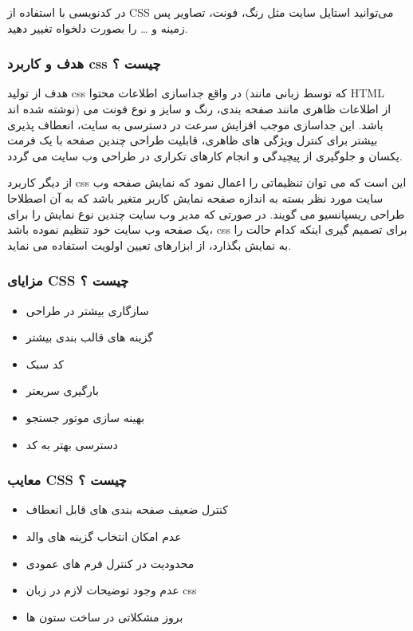 در کدنویسی با استفاده از CSS می‌توانید استایل سایت مثل رنگ، فونت، تصاویر پس زمینه و … را بصورت دلخواه تغییر دهید.

\subsubsection{هدف و کاربرد css چیست ؟}
هدف از تولید css در واقع جداسازی اطلاعات محتوا (که توسط زبانی مانند HTML نوشته شده اند) از اطلاعات ظاهری مانند صفحه بندی، رنگ و سایز و نوع فونت می باشد. این جداسازی موجب افزایش سرعت در دسترسی به سایت، انعطاف پذیری بیشتر برای کنترل ویژگی های ظاهری، قابلیت طراحی چندین صفحه با یک فرمت یکسان و جلوگیری از پیچیدگی و انجام کارهای تکراری در طراحی وب سایت می گردد.

از دیگر کاربرد css این است که می توان تنظیماتی را اعمال نمود که نمایش صفحه وب سایت مورد نظر بسته به اندازه صفحه نمایش کاربر متغیر باشد که به آن اصطلاحا طراحی ریسپانسیو می گویند. در صورتی که مدیر وب سایت چندین نوع نمایش را برای یک صفحه وب سایت خود تنظیم نموده باشد،  css برای تصمیم گیری اینکه کدام حالت را به نمایش بگذارد، از ابزارهای تعیین اولویت استفاده می نماید.

\subsubsection{مزایای CSS چیست ؟}
\begin{itemize}
	\item 
	سازگاری بیشتر در طراحی
	\item 
	گزینه های قالب بندی بیشتر
	\item 
	کد سبک
	\item 
	بارگیری سریعتر
	\item 
	بهینه سازی موتور جستجو
	\item 
	دسترسی بهتر به کد
\end{itemize}


\subsubsection{معایب CSS چیست ؟}
\begin{itemize}
	\item 
	کنترل ضعیف صفحه بندی های قابل انعطاف
	\item 
	عدم امکان انتخاب گزینه های والد
	\item 
	محدودیت در کنترل فرم های عمودی
	\item 
	عدم وجود توضیحات لازم در زبان css 
	\item 
	بروز مشکلاتی در ساخت ستون ها
\end{itemize}


